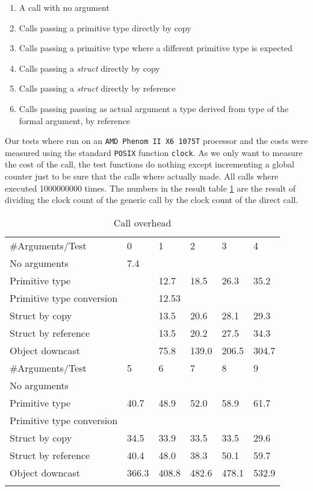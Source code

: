 \begin{enumerate}
 \item A call with no argument
 \item Calls passing a primitive type directly by copy
 \item Calls passing a primitive type where a different primitive type is expected
 \item Calls passing a \emph{struct} directly by copy
 \item Calls passing a \emph{struct} directly by reference 
 \item Calls passing passing as actual argument a type derived from type of the formal argument, by reference
\end{enumerate}

Our tests where run on an \texttt{AMD Phenom II X6 1075T} processor and the costs were measured using the standard \texttt{POSIX} function \texttt{clock}.
As we only want to measure the cost of the call, the test functions do nothing except incrementing a global counter just to be sure that the calls where
actually made. All calls where executed 1000000000 times. The numbers in the result table \ref{tab:overhead} are the result of dividing the clock count of the generic call
by the clock count of the direct call.

\begin{table}
\caption {Call overhead} \label{tab:overhead} 

\begin{center}

\begin{tabular}{llllll}
\hline\noalign{\smallskip}
\#Arguments/Test & 0 & 1 & 2 & 3 & 4\\
\noalign{\smallskip}
\hline
\noalign{\smallskip}
No arguments & 7.4 &&&&\\
Primitive type && 12.7 & 18.5 & 26.3 & 35.2\\
Primitive type conversion && 12.53 &&&\\
Struct by copy && 13.5 & 20.6 & 28.1 & 29.3\\
Struct by reference && 13.5 & 20.2 & 27.5 & 34.3\\
Object downcast && 75.8 & 139.0 & 206.5 & 304.7\\
\noalign{\smallskip}
\hline
\noalign{\smallskip}
\#Arguments/Test & 5 & 6 & 7 & 8 & 9\\
\noalign{\smallskip}
\hline
\noalign{\smallskip}
No arguments &&&&&\\
Primitive type & 40.7 & 48.9 & 52.0 & 58.9 & 61.7\\
Primitive type conversion &&&&&\\
Struct by copy & 34.5 & 33.9 & 33.5 & 33.5 & 29.6\\
Struct by reference & 40.4 & 48.0 & 38.3 & 50.1 & 59.7\\
Object downcast & 366.3 & 408.8 & 482.6 & 478.1 & 532.9\\
\noalign{\smallskip}
\hline
\end{tabular}

\end{center}
\end{table}

